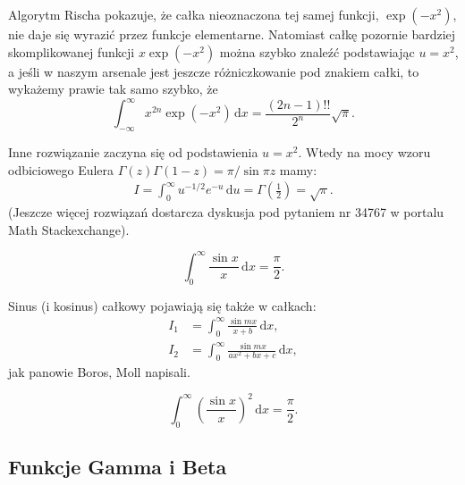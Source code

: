 Algorytm Rischa pokazuje, że całka nieoznaczona tej samej funkcji, $\exp (-x^2)$, nie daje się wyrazić przez funkcje elementarne.
Natomiast całkę pozornie bardziej skomplikowanej funkcji $x \exp (-x^2)$ można szybko znaleźć podstawiając $u = x^2$, a jeśli w naszym arsenale jest jeszcze różniczkowanie pod znakiem całki, to wykażemy prawie tak samo szybko, że
\begin{equation}
    \int_{-\infty}^\infty x^{2n} \exp (-x^2) \,\mathrm{d}x = \frac{(2n-1)!!}{2^n} \sqrt \pi.
\end{equation}

Inne rozwiązanie zaczyna się od podstawienia $u = x^2$.
Wtedy na mocy wzoru odbiciowego Eulera $\Gamma (z) \Gamma(1-z) = \pi/\sin \pi z$ mamy:
\begin{align}
	I = \int_0^\infty u^{-1/2} e^{-u}\,\mathrm{d}u = \Gamma \left(\frac 12\right) = \sqrt{\pi}.
\end{align}
(Jeszcze więcej rozwiązań dostarcza dyskusja pod pytaniem nr 34767 w portalu Math Stackexchange).




\begin{problem}
    \begin{equation}
        \int_0^\infty \frac {\sin x}{x} \,\mathrm{d} x = \frac \pi 2.
    \end{equation}
\end{problem}

Sinus (i kosinus) całkowy pojawiają się także w całkach:
\begin{align}
    I_1 & = \int_0^\infty \frac{\sin mx}{x + b} \,\mathrm{d}x, \\
    I_2 & = \int_0^\infty \frac{\sin mx}{ax^2 + bx + c} \,\mathrm{d}x,
\end{align}
jak panowie Boros, Moll \cite[s. 136]{boros04} napisali.

\begin{problem}
    \begin{equation}
        \int_0^\infty \left(\frac {\sin x}{x}\right)^2 \,\mathrm{d} x = \frac \pi 2.
    \end{equation}
\end{problem}

\subsection{Funkcje Gamma i Beta}
